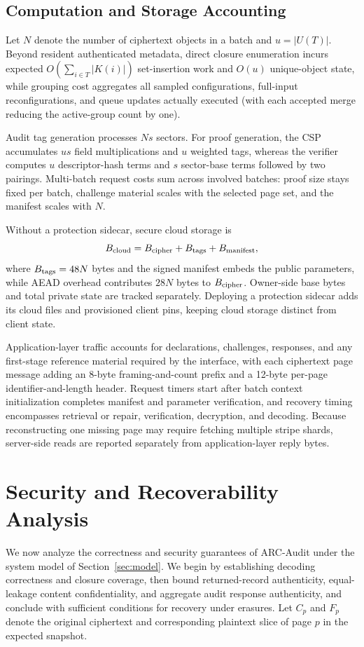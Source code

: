 \documentclass[10pt,journal]{IEEEtran}
\begin{document}
\subsection{Computation and Storage Accounting}\label{sec:accounting}
Let $N$ denote the number of ciphertext objects in a batch and $u=|U(T)|$. Beyond resident authenticated metadata, direct closure enumeration incurs expected $O(\sum_{i\in T}|K(i)|)$ set-insertion work and $O(u)$ unique-object state, while grouping cost aggregates all sampled configurations, full-input reconfigurations, and queue updates actually executed (with each accepted merge reducing the active-group count by one).

Audit tag generation processes $Ns$ sectors. For proof generation, the CSP accumulates $us$ field multiplications and $u$ weighted tags, whereas the verifier computes $u$ descriptor-hash terms and $s$ sector-base terms followed by two pairings. Multi-batch request costs sum across involved batches: proof size stays fixed per batch, challenge material scales with the selected page set, and the manifest scales with $N$.

Without a protection sidecar, secure cloud storage is
\begin{equation}\label{eq:cloud-cost}
B_{\rm cloud}=B_{\rm cipher}+B_{\rm tags}+B_{\rm manifest},
\end{equation}
where $B_{\rm tags}=48N$ bytes and the signed manifest embeds the public parameters, while AEAD overhead contributes $28N$ bytes to $B_{\rm cipher}$. Owner-side base bytes and total private state are tracked separately. Deploying a protection sidecar adds its cloud files and provisioned client pins, keeping cloud storage distinct from client state.

Application-layer traffic accounts for declarations, challenges, responses, and any first-stage reference material required by the interface, with each ciphertext page message adding an 8-byte framing-and-count prefix and a 12-byte per-page identifier-and-length header. Request timers start after batch context initialization completes manifest and parameter verification, and recovery timing encompasses retrieval or repair, verification, decryption, and decoding. Because reconstructing one missing page may require fetching multiple stripe shards, server-side reads are reported separately from application-layer reply bytes.

\section{Security and Recoverability Analysis}\label{sec:security}
We now analyze the correctness and security guarantees of ARC-Audit under the system model of Section~\ref{sec:model}. We begin by establishing decoding correctness and closure coverage, then bound returned-record authenticity, equal-leakage content confidentiality, and aggregate audit response authenticity, and conclude with sufficient conditions for recovery under erasures. Let $C_p$ and $F_p$ denote the original ciphertext and corresponding plaintext slice of page $p$ in the expected snapshot.
\end{document}

